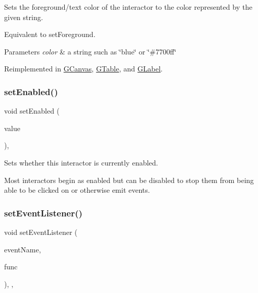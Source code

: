 Sets the foreground/text color of the interactor to the color represented by the given string. 

Equivalent to set\+Foreground. 
\begin{DoxyParams}{Parameters}
{\em color} & a string such as \char`\"{}blue\char`\"{} or \char`\"{}\#7700ff\char`\"{} \\
\hline
\end{DoxyParams}


Reimplemented in \mbox{\hyperlink{classGCanvas_ad148324da1b0340e84e24dffa577ffca}{G\+Canvas}}, \mbox{\hyperlink{classGTable_ad148324da1b0340e84e24dffa577ffca}{G\+Table}}, and \mbox{\hyperlink{classGLabel_ad148324da1b0340e84e24dffa577ffca}{G\+Label}}.

\mbox{\label{classGInteractor_ab831367dd84bbd579e02e55bacb21343}} 
\subsubsection{\texorpdfstring{set\+Enabled()}{setEnabled()}}
{\footnotesize\ttfamily void set\+Enabled (\begin{DoxyParamCaption}\item[{bool}]{value }\end{DoxyParamCaption})\hspace{0.3cm}{\ttfamily [virtual]}, {\ttfamily [inherited]}}



Sets whether this interactor is currently enabled. 

Most interactors begin as enabled but can be disabled to stop them from being able to be clicked on or otherwise emit events. \mbox{\label{classGObservable_ad2f6d34961c50f6c1e0659990b79f741}} 
\subsubsection{\texorpdfstring{set\+Event\+Listener()}{setEventListener()}\hspace{0.1cm}{\footnotesize\ttfamily [1/2]}}
{\footnotesize\ttfamily void set\+Event\+Listener (\begin{DoxyParamCaption}\item[{const std\+::string \&}]{event\+Name,  }\item[{G\+Event\+Listener}]{func }\end{DoxyParamCaption})\hspace{0.3cm}{\ttfamily [protected]}, {\ttfamily [virtual]}, {\ttfamily [inherited]}}



